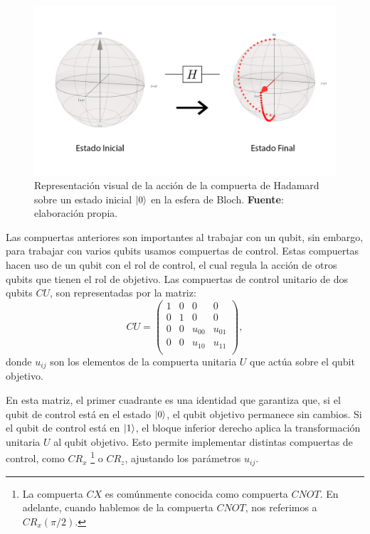 \documentclass[letterpaper,12pt]{thesisECFM}
\theoremstyle{plain}
\theoremstyle{definition}
\theoremstyle{definition}
\theoremstyle{remark}
\newcommand{\1}{\mathbb{1}}
\begin{document}
\begin{figure}
    \centering
    \includegraphics[scale=0.15]{imagenes/Haddamard.png}
    \caption{Representación visual de la acción de la compuerta de Hadamard sobre un estado inicial $\ket{0}$ en la esfera de Bloch. \textbf{Fuente}: elaboración propia.}
    \label{fig:hadamard}
\end{figure}

Las compuertas anteriores son importantes al trabajar con un qubit, sin
embargo, para trabajar con varios qubits usamos compuertas de control.
Estas compuertas hacen uso de un qubit con el rol de  control, el cual
regula la acción de otros qubits que tienen el rol de objetivo. Las compuertas de control unitario de dos qubits $CU$, son representadas por la matriz:
\begin{equation}
    CU = 
    \begin{pmatrix}
    \label{ec:2.27}
    1 & 0 & 0 & 0 \\
    0 & 1 & 0 & 0 \\
     0& 0 & u_{00} & u_{01} \\
     0&  0&  u_{10}&u_{11} \\
    \end{pmatrix},
\end{equation}
donde $u_{ij}$ son los elementos de la compuerta unitaria $U$ que actúa sobre el qubit objetivo.

En esta matriz, el primer cuadrante es una identidad que garantiza que, si el qubit de control está en el estado $\ket{0}$, el qubit objetivo permanece sin cambios. Si el qubit de control está en $\ket{1}$, el bloque inferior derecho aplica la transformación unitaria $U$ al qubit objetivo. Esto permite implementar distintas compuertas de control, como $CR_x$ \footnote{La compuerta $CX$ es comúnmente conocida como compuerta $CNOT$. En adelante, cuando hablemos de la compuerta $CNOT$, nos referimos a $CR_x(\pi/2)$.}  o $CR_z$, ajustando los parámetros $u_{ij}$.
\end{document}
